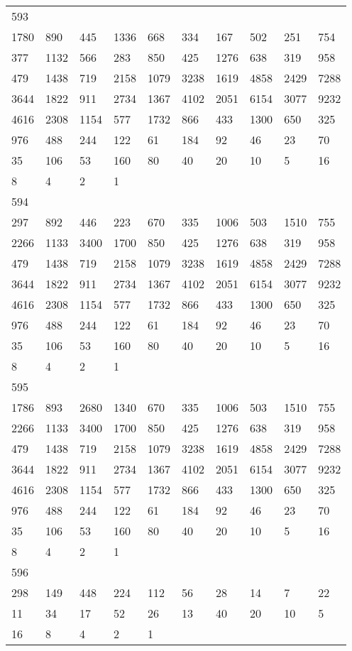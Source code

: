 \begin{longtable}{*{10}{l}}
593&&&&&&&&&\\
1780& 890& 445& 1336& 668& 334& 167& 502& 251& 754\\
377& 1132& 566& 283& 850& 425& 1276& 638& 319& 958\\
479& 1438& 719& 2158& 1079& 3238& 1619& 4858& 2429& 7288\\
3644& 1822& 911& 2734& 1367& 4102& 2051& 6154& 3077& 9232\\
4616& 2308& 1154& 577& 1732& 866& 433& 1300& 650& 325\\
976& 488& 244& 122& 61& 184& 92& 46& 23& 70\\
35& 106& 53& 160& 80& 40& 20& 10& 5& 16\\
8& 4& 2& 1& \\

594&&&&&&&&&\\
297& 892& 446& 223& 670& 335& 1006& 503& 1510& 755\\
2266& 1133& 3400& 1700& 850& 425& 1276& 638& 319& 958\\
479& 1438& 719& 2158& 1079& 3238& 1619& 4858& 2429& 7288\\
3644& 1822& 911& 2734& 1367& 4102& 2051& 6154& 3077& 9232\\
4616& 2308& 1154& 577& 1732& 866& 433& 1300& 650& 325\\
976& 488& 244& 122& 61& 184& 92& 46& 23& 70\\
35& 106& 53& 160& 80& 40& 20& 10& 5& 16\\
8& 4& 2& 1& \\

595&&&&&&&&&\\
1786& 893& 2680& 1340& 670& 335& 1006& 503& 1510& 755\\
2266& 1133& 3400& 1700& 850& 425& 1276& 638& 319& 958\\
479& 1438& 719& 2158& 1079& 3238& 1619& 4858& 2429& 7288\\
3644& 1822& 911& 2734& 1367& 4102& 2051& 6154& 3077& 9232\\
4616& 2308& 1154& 577& 1732& 866& 433& 1300& 650& 325\\
976& 488& 244& 122& 61& 184& 92& 46& 23& 70\\
35& 106& 53& 160& 80& 40& 20& 10& 5& 16\\
8& 4& 2& 1& \\

596&&&&&&&&&\\
298& 149& 448& 224& 112& 56& 28& 14& 7& 22\\
11& 34& 17& 52& 26& 13& 40& 20& 10& 5\\
16& 8& 4& 2& 1& \\


\end{longtable}
